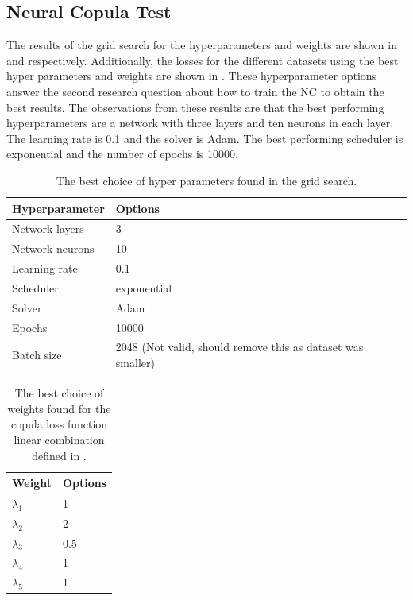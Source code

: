 \subsection{Neural Copula Test}
The results of the grid search for the hyperparameters and weights are shown in  and  respectively. Additionally, the losses for the different datasets using the best hyper parameters and weights are shown in . These hyperparameter options answer the second research question \RQtwo about how to train the \gls{NC} to obtain the best results. The observations from these results are that the best performing hyperparameters are a network with three layers and ten neurons in each layer. The learning rate is 0.1 and the solver is Adam. The best performing scheduler is exponential and the number of epochs is 10000. 

\begin{table}[h!]
    \centering
    \caption{The best choice of hyper parameters found in the grid search.}
    \begin{tabular}{ll}
    \textbf{Hyperparameter} & \textbf{Options} \\
    \hline
    Network layers & 3 \\
    Network neurons & 10 \\
    Learning rate & 0.1 \\
    Scheduler & exponential \\
    Solver & Adam \\
    Epochs & 10000 \\
    Batch size & 2048 (Not valid, should remove this as dataset was smaller)\\
    \end{tabular}
    \label{tab:Best_hyperparams}
\end{table}
    
\begin{table}[h!]
    \centering
    \caption{The best choice of weights found for the copula loss function linear combination defined in .}
    \begin{tabular}{ll}
    \textbf{Weight} & \textbf{Options} \\
    \hline
    $\lambda_1$ & 1 \\
    $\lambda_2$ & 2 \\
    $\lambda_3$ & 0.5 \\
    $\lambda_4$ & 1 \\
    $\lambda_5$ & 1 \\
    \end{tabular}
    \label{tab:Best_weights}
\end{table}
    

